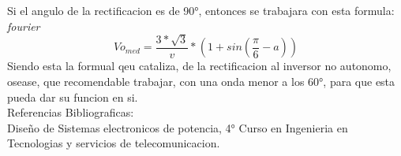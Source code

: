 \documentclass[12pt,a4paper]{article}
\begin{document}
Si el angulo de la rectificacion es de 90°, entonces se trabajara con esta formula:
\emph{fourier}
$$ Vo_{med}= \frac{3*\sqrt{3}}{v}*(1+ sin(\frac{\pi}{6}-a)) $$
Siendo esta la formual qeu cataliza, de la rectificacion al inversor no autonomo, osease, que recomendable trabajar, con una onda menor a los 60°, para que esta pueda dar su funcion en si.\\

Referencias Bibliograficas:\\
Diseño de Sistemas electronicos de potencia, 4° Curso en Ingenieria en Tecnologias y servicios de telecomunicacion.
\end{document}
